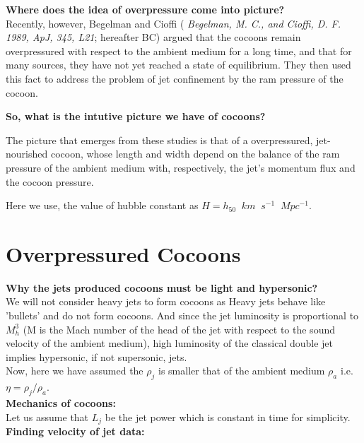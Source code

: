 \documentclass[11pt]{report}
\newcommand{\tbf}[1]{\textbf{#1}}
\newcommand{\tit}[1]{\textit{#1}}
\newcommand{\cbox}{tcolorbox}
\begin{document}
\tbf{Where does the idea of overpressure come into picture?}\\
Recently, however, Begelman and Cioffi ( \tit{Begelman, M. C., and Cioffi, D. F. 1989, ApJ, 345, L21}; hereafter BC) argued that the cocoons remain overpressured with respect to the ambient medium for a long time, and that for many sources, they have not yet reached a state of equilibrium. They then used this fact to address the problem of jet confinement by the ram pressure of the cocoon.

\tbf{So, what is the intutive picture we have of cocoons?}\\
\begin{\cbox} 
The picture that emerges from these studies is that of a overpressured, jet-nourished cocoon, whose length and width depend on the balance of the ram pressure of the ambient medium with, respectively, the jet's momentum flux and the cocoon pressure. 
\end{\cbox}

Here we use, the value of hubble constant as $H=h_{50}\;\;km\;\;s^{-1}\;\;Mpc^{-1}$.
\section{Overpressured Cocoons}
\tbf{Why the jets produced cocoons must be light and hypersonic?}\\

We will not consider heavy jets to form cocoons as  Heavy jets behave like 'bullets' and do not form cocoons. And since the jet luminosity is proportional to$ M^3_h$ (M is the Mach number of the head of the jet with respect to the sound velocity of the ambient medium), high luminosity of the classical double jet implies hypersonic, if not supersonic, jets.\\

Now, here we have assumed the $\rho_j$ is smaller that of the ambient medium $\rho_a$ i.e. $\eta=\rho_j/\rho_a$. \\

\tbf{Mechanics of cocoons:}\\

Let us assume that $L_j$ be the jet power which is constant in time for simplicity.\\

\tbf{Finding velocity of jet data:}\\
\end{document}
